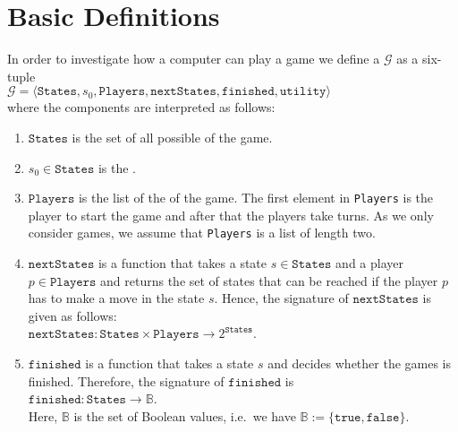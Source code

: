 \section{Basic Definitions}
In order to investigate how a computer can play a game we define a  $\mathcal{G}$ as a six-tuple 
\\[0.2cm]
\hspace*{1.3cm}
$\mathcal{G} = \langle \texttt{States}, s_0, \texttt{Players}, \texttt{nextStates}, \texttt{finished},\texttt{utility} \rangle$
\\[0.2cm]
where the components are interpreted as follows:
\begin{enumerate}
\item $\texttt{States}$ is the set of all possible  of the game.
\item $s_0 \in \texttt{States}$ is the .
\item $\texttt{Players}$ is  the list of the  of the game.  The first element in \texttt{Players} is
      the player to start the game and after that the players take turns.  As we only consider 
      games, we assume that \texttt{Players} is a list of length two.  
\item $\texttt{nextStates}$ is a function that takes a state $s \in \texttt{States}$ and a player $p \in \texttt{Players}$ and returns the set of
      states that can be reached if the player $p$ has to make a move in the state $s$.  Hence, the signature of
      $\texttt{nextStates}$ is given as follows:
      \\[0.2cm]
      \hspace*{1.3cm}
      $\texttt{nextStates}: \texttt{States} \times \texttt{Players} \rightarrow 2^{\texttt{States}}$.
\item $\texttt{finished}$ is a function that takes a state $s$ and decides whether the games is finished.
      Therefore, the signature of $\texttt{finished}$ is
      \\[0.2cm]
      \hspace*{1.3cm}
      $\texttt{finished}: \texttt{States} \rightarrow \mathbb{B}$.
      \\[0.2cm]
      Here, $\mathbb{B}$ is the set of Boolean values, i.e.~we have $\mathbb{B} := \{ \texttt{true}, \texttt{false} \}$.
  

\end{enumerate}
